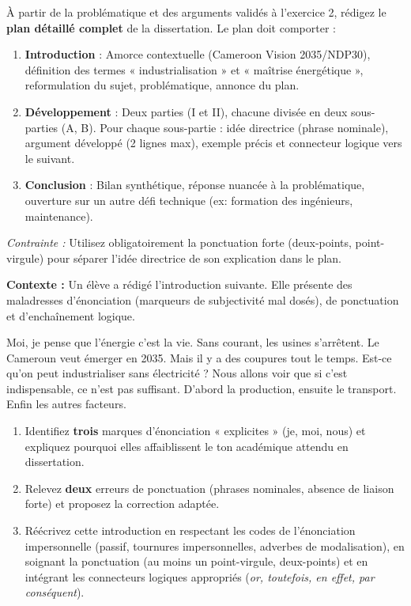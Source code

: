 \documentclass[11pt]{article}
\begin{document}
\begin{exercice}
À partir de la problématique et des arguments validés à l'exercice 2, rédigez le \textbf{plan détaillé complet} de la dissertation. Le plan doit comporter :

\begin{enumerate}
    \item \textbf{Introduction} : Amorce contextuelle (Cameroon Vision 2035/NDP30), définition des termes « industrialisation » et « maîtrise énergétique », reformulation du sujet, problématique, annonce du plan.
    \item \textbf{Développement} : Deux parties (I et II), chacune divisée en deux sous-parties (A, B). Pour chaque sous-partie : idée directrice (phrase nominale), argument développé (2 lignes max), exemple précis et connecteur logique vers le suivant.
    \item \textbf{Conclusion} : Bilan synthétique, réponse nuancée à la problématique, ouverture sur un autre défi technique (ex: formation des ingénieurs, maintenance).
\end{enumerate}
\textit{Contrainte :} Utilisez obligatoirement la ponctuation forte (deux-points, point-virgule) pour séparer l'idée directrice de son explication dans le plan.
\end{exercice}

\begin{exercice}
\textbf{Contexte :} Un élève a rédigé l'introduction suivante. Elle présente des maladresses d'énonciation (marqueurs de subjectivité mal dosés), de ponctuation et d'enchaînement logique.

\og Moi, je pense que l'énergie c'est la vie. Sans courant, les usines s'arrêtent. Le Cameroun veut émerger en 2035. Mais il y a des coupures tout le temps. Est-ce qu'on peut industrialiser sans électricité ? Nous allons voir que si c'est indispensable, ce n'est pas suffisant. D'abord la production, ensuite le transport. Enfin les autres facteurs. \fg{}

\begin{enumerate}
    \item Identifiez \textbf{trois} marques d'énonciation « explicites » (je, moi, nous) et expliquez pourquoi elles affaiblissent le ton académique attendu en dissertation.
    \item Relevez \textbf{deux} erreurs de ponctuation (phrases nominales, absence de liaison forte) et proposez la correction adaptée.
    \item Réécrivez cette introduction en respectant les codes de l'énonciation impersonnelle (passif, tournures impersonnelles, adverbes de modalisation), en soignant la ponctuation (au moins un point-virgule, deux-points) et en intégrant les connecteurs logiques appropriés (\textit{or, toutefois, en effet, par conséquent}).
\end{enumerate}
\end{exercice}
\end{document}
